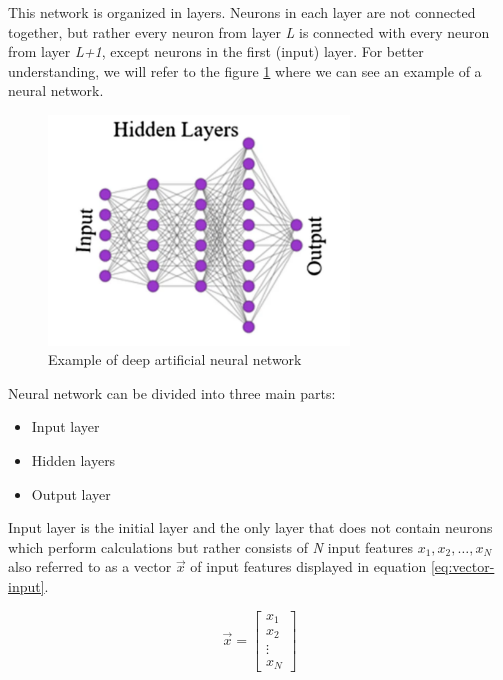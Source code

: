 This network is organized in layers. Neurons in each layer are not connected together, but rather every neuron from layer \textit{L} is connected with every neuron from layer \textit{L+1}, except neurons in the first (input) layer. For better understanding, we will refer to the figure \ref{tab:artificial-nn} where we can see an example of a neural network.

\begin{figure}[H]
\begin{centering}
\includegraphics[width=8cm]{assets/images/neural_net.png}
\par\end{centering}
\caption{Example of deep artificial neural network \cite{TalaeiKhoei2023}}
\label{tab:artificial-nn}
\end{figure}

Neural network can be divided into three main parts:

\begin{itemize}
    \item Input layer
    \item Hidden layers
    \item Output layer
\end{itemize}

Input layer is the initial layer and the only layer that does not contain neurons which perform calculations but rather consists of \textit{N} input features $x_1, x_2, \dots, x_N$ also referred to as a vector $\vec{x}$ of input features displayed in equation \ref{eq:vector-input}.

\begin{equation}
\label{eq:vector-input}
\vec{x} = \begin{bmatrix}
x_1 \\
x_2 \\
\vdots \\
x_N
\end{bmatrix}
\end{equation}

